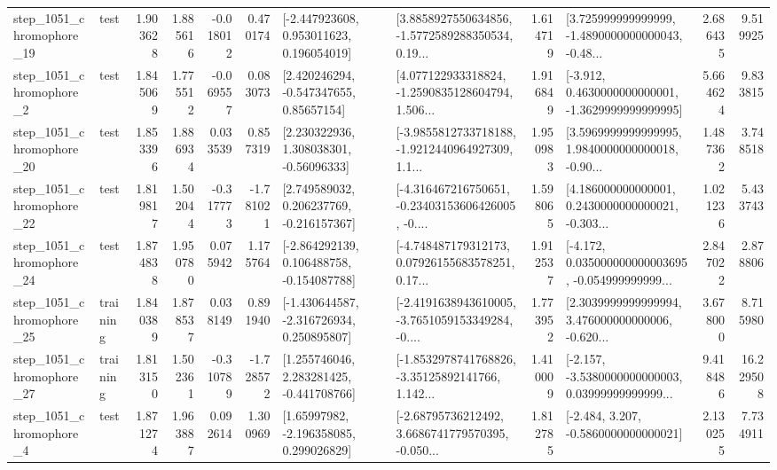 \begin{tabular}{llrrrrllrlrr}
 step\_1051\_chromophore\_19 &      test &      1.903628 &    1.885616 &     -0.018012 &  0.470174 &    [-2.447923608, 0.953011623, 0.196054019] &  [3.8858927550634856, -1.5772589288350534, 0.19... &       1.614719 &  [3.725999999999999, -1.4890000000000043, -0.48... &            2.686435 &          9.519925 \\
  step\_1051\_chromophore\_2 &      test &      1.845069 &    1.775512 &     -0.069557 &  0.083073 &     [2.420246294, -0.547347655, 0.85657154] &  [4.077122933318824, -1.2590835128604794, 1.506... &       1.916849 &  [-3.912, 0.4630000000000001, -1.3629999999999995] &            5.664624 &          9.833815 \\
 step\_1051\_chromophore\_20 &      test &      1.853396 &    1.886934 &      0.033539 &  0.857319 &     [2.230322936, 1.308038301, -0.56096333] &  [-3.9855812733718188, -1.9212440964927309, 1.1... &       1.950983 &  [3.5969999999999995, 1.9840000000000018, -0.90... &            1.487362 &          3.748518 \\
 step\_1051\_chromophore\_22 &      test &      1.819817 &    1.502044 &     -0.317773 & -1.781021 &    [2.749589032, 0.206237769, -0.216157367] &  [-4.316467216750651, -0.23403153606426005, -0.... &       1.598065 &  [4.186000000000001, 0.2430000000000021, -0.303... &            1.021236 &          5.433743 \\
 step\_1051\_chromophore\_24 &      test &      1.874838 &    1.950780 &      0.075942 &  1.175764 &   [-2.864292139, 0.106488758, -0.154087788] &  [-4.748487179312173, 0.07926155683578251, 0.17... &       1.912537 &  [-4.172, 0.035000000000003695, -0.054999999999... &            2.847022 &          2.878806 \\
 step\_1051\_chromophore\_25 &  training &      1.840389 &    1.878537 &      0.038149 &  0.891940 &   [-1.430644587, -2.316726934, 0.250895807] &  [-2.4191638943610005, -3.7651059153349284, -0.... &       1.773952 &  [2.3039999999999994, 3.476000000000006, -0.620... &            3.678000 &          8.715980 \\
 step\_1051\_chromophore\_27 &  training &      1.813150 &    1.502361 &     -0.310789 & -1.728572 &    [1.255746046, 2.283281425, -0.441708766] &  [-1.8532978741768826, -3.35125892141766, 1.142... &       1.410009 &  [-2.157, -3.5380000000000003, 0.03999999999999... &            9.418486 &         16.229508 \\
  step\_1051\_chromophore\_4 &      test &      1.871274 &    1.963887 &      0.092614 &  1.300969 &     [1.65997982, -2.196358085, 0.299026829] &  [-2.68795736212492, 3.6686741779570395, -0.050... &       1.812785 &               [-2.484, 3.207, -0.5860000000000021] &            2.130255 &          7.734911 \\

\end{tabular}
